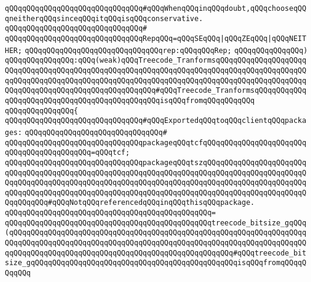 \verb|qQQqqQQqqQQqqQQqqQQqqQQqqQQqqQQq#qQQqWhenqQQqinqQQqdoubt,qQQqchooseqQQqneitherqQQqsinceqQQqitqQQqisqQQqconservative.|\newline
\verb|qQQqqQQqqQQqqQQqqQQqqQQqqQQqqQQq#|\newline
\verb|qQQqqQQqqQQqqQQqqQQqqQQqqQQqqQQqRepqQQq=qQQqSEqQQq|\verb#|qQQqZEqQQq|qQQqNEITHER;#\newline
\newline
\verb|qQQqqQQqqQQqqQQqqQQqqQQqqQQqqQQqrep:qQQqqQQqRep;|\newline
\verb|qQQqqQQqqQQqqQQq)|\newline
\verb|qQQqqQQqqQQqqQQq:qQQq(weak)qQQqTreecode_TranformsqQQqqQQqqQQqqQQqqQQqqQQqqQQqqQQqqQQqqQQqqQQqqQQqqQQqqQQqqQQqqQQqqQQqqQQqqQQqqQQqqQQqqQQqqQQqqQQqqQQqqQQqqQQqqQQqqQQqqQQqqQQqqQQqqQQqqQQqqQQqqQQqqQQqqQQqqQQqqQQqqQQqqQQqqQQqqQQqqQQqqQQqqQQqqQQqqQQq#qQQqTreecode_TranformsqQQqqQQqqQQqqQQqqQQqqQQqqQQqqQQqqQQqqQQqqQQqqQQqisqQQqfromqQQqqQQqqQQq|\newline
\verb|qQQqqQQqqQQqqQQq{|\newline
\verb|qQQqqQQqqQQqqQQqqQQqqQQqqQQqqQQq#qQQqExportedqQQqtoqQQqclientqQQqpackages:|\newline
\verb|qQQqqQQqqQQqqQQqqQQqqQQqqQQqqQQq#|\newline
\verb|qQQqqQQqqQQqqQQqqQQqqQQqqQQqqQQqpackageqQQqtcfqQQqqQQqqQQqqQQqqQQqqQQqqQQqqQQqqQQqqQQqqQQq=qQQqtcf;|\newline
\verb|qQQqqQQqqQQqqQQqqQQqqQQqqQQqqQQqpackageqQQqtszqQQqqQQqqQQqqQQqqQQqqQQqqQQqqQQqqQQqqQQqqQQqqQQqqQQqqQQqqQQqqQQqqQQqqQQqqQQqqQQqqQQqqQQqqQQqqQQqqQQqqQQqqQQqqQQqqQQqqQQqqQQqqQQqqQQqqQQqqQQqqQQqqQQqqQQqqQQqqQQqqQQqqQQqqQQqqQQqqQQqqQQqqQQqqQQqqQQqqQQqqQQqqQQqqQQqqQQqqQQqqQQqqQQqqQQqqQQqqQQqqQQq#qQQqNotqQQqreferencedqQQqinqQQqthisqQQqpackage.|\newline
\verb|qQQqqQQqqQQqqQQqqQQqqQQqqQQqqQQqqQQqqQQqqQQqqQQq=|\newline
\verb|qQQqqQQqqQQqqQQqqQQqqQQqqQQqqQQqqQQqqQQqqQQqqQQqtreecode_bitsize_gqQQq(qQQqqQQqqQQqqQQqqQQqqQQqqQQqqQQqqQQqqQQqqQQqqQQqqQQqqQQqqQQqqQQqqQQqqQQqqQQqqQQqqQQqqQQqqQQqqQQqqQQqqQQqqQQqqQQqqQQqqQQqqQQqqQQqqQQqqQQqqQQqqQQqqQQqqQQqqQQqqQQqqQQqqQQqqQQqqQQqqQQqqQQqqQQqqQQq#qQQqtreecode_bitsize_gqQQqqQQqqQQqqQQqqQQqqQQqqQQqqQQqqQQqqQQqqQQqqQQqisqQQqfromqQQqqQQqqQQq|\newline
